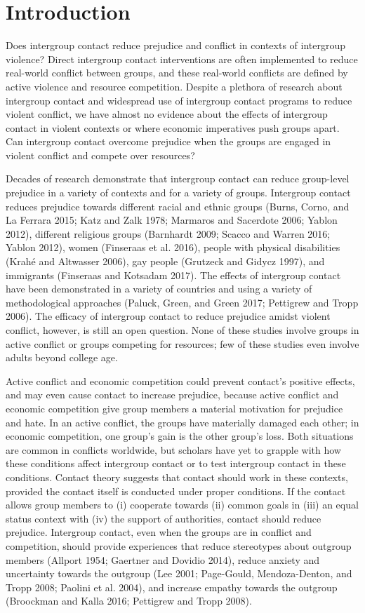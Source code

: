 \documentclass[11pt]{article}
\begin{document}
\section{Introduction}\label{introduction}

Does intergroup contact reduce prejudice and conflict in contexts of
intergroup violence? Direct intergroup contact interventions are often
implemented to reduce real-world conflict between groups, and these
real-world conflicts are defined by active violence and resource
competition. Despite a plethora of research about intergroup contact and
widespread use of intergroup contact programs to reduce violent
conflict, we have almost no evidence about the effects of intergroup
contact in violent contexts or where economic imperatives push groups
apart. Can intergroup contact overcome prejudice when the groups are
engaged in violent conflict and compete over resources?

Decades of research demonstrate that intergroup contact can reduce
group-level prejudice in a variety of contexts and for a variety of
groups. Intergroup contact reduces prejudice towards different racial
and ethnic groups (Burns, Corno, and La Ferrara 2015; Katz and Zalk
1978; Marmaros and Sacerdote 2006; Yablon 2012), different religious
groups (Barnhardt 2009; Scacco and Warren 2016; Yablon 2012), women
(Finseraas et al. 2016), people with physical disabilities (Krahé and
Altwasser 2006), gay people (Grutzeck and Gidycz 1997), and immigrants
(Finseraas and Kotsadam 2017). The effects of intergroup contact have
been demonstrated in a variety of countries and using a variety of
methodological approaches (Paluck, Green, and Green 2017; Pettigrew and
Tropp 2006). The efficacy of intergroup contact to reduce prejudice
amidst violent conflict, however, is still an open question. None of
these studies involve groups in active conflict or groups competing for
resources; few of these studies even involve adults beyond college age.

Active conflict and economic competition could prevent contact's
positive effects, and may even cause contact to increase prejudice,
because active conflict and economic competition give group members a
material motivation for prejudice and hate. In an active conflict, the
groups have materially damaged each other; in economic competition, one
group's gain is the other group's loss. Both situations are common in
conflicts worldwide, but scholars have yet to grapple with how these
conditions affect intergroup contact or to test intergroup contact in
these conditions. Contact theory suggests that contact should work in
these contexts, provided the contact itself is conducted under proper
conditions. If the contact allows group members to (i) cooperate towards
(ii) common goals in (iii) an equal status context with (iv) the support
of authorities, contact should reduce prejudice. Intergroup contact,
even when the groups are in conflict and competition, should provide
experiences that reduce stereotypes about outgroup members (Allport
1954; Gaertner and Dovidio 2014), reduce anxiety and uncertainty towards
the outgroup (Lee 2001; Page-Gould, Mendoza-Denton, and Tropp 2008;
Paolini et al. 2004), and increase empathy towards the outgroup
(Broockman and Kalla 2016; Pettigrew and Tropp 2008).
\end{document}
